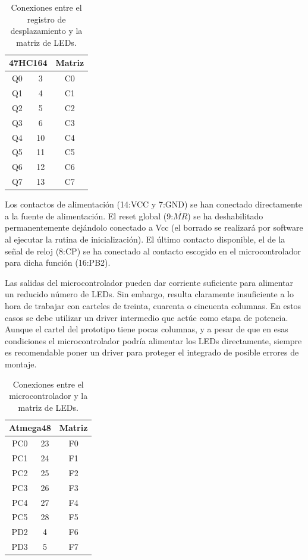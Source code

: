 \begin{table}[!htp]
\centering
\begin{tabular}[c]{|c|c|c|}
\hline
\multicolumn{2}{|c|}{\textbf{47HC164}} & \textbf{Matriz} \\
\hline
Q0 & 3 & C0 \\ \hline
Q1 & 4 & C1 \\ \hline
Q2 & 5 & C2 \\ \hline
Q3 & 6 & C3 \\ \hline
Q4 & 10 & C4 \\ \hline
Q5 & 11 & C5 \\ \hline
Q6 & 12 & C6 \\ \hline
Q7 & 13 & C7 \\
\hline
\end{tabular}
\caption{Conexiones entre el registro de desplazamiento y la matriz de LEDs.}
\label{tab:reg_col}
\end{table}

Los contactos de alimentación (14:VCC y 7:GND) se han conectado directamente a la fuente de alimentación. El reset global (9:$\overline{MR}$) se ha deshabilitado permanentemente dejándolo conectado a Vcc (el borrado se realizará por software al ejecutar la rutina de inicialización). El último contacto disponible, el de la señal de reloj (8:CP) se ha conectado al contacto escogido en el microcontrolador para dicha función (16:PB2).

Las salidas del microcontrolador pueden dar corriente suficiente para alimentar un reducido número de LEDs. Sin embargo, resulta claramente insuficiente a lo hora de trabajar con carteles de treinta, cuarenta o cincuenta columnas. En estos casos se debe utilizar un driver intermedio que actúe como etapa de potencia. Aunque el cartel del prototipo tiene pocas columnas, y a pesar de que en esas condiciones el microcontrolador podría alimentar los LEDs directamente, siempre es recomendable poner un driver para proteger el integrado de posible errores de montaje.

\begin{table}[!htp]
\centering
\begin{tabular}[c]{|c|c|c|}
\hline
\multicolumn{2}{|c|}{\textbf{Atmega48}} & \textbf{Matriz} \\
\hline
PC0 & 23 & F0 \\ \hline
PC1 & 24 & F1 \\ \hline
PC2 & 25 & F2 \\ \hline
PC3 & 26 & F3 \\ \hline
PC4 & 27 & F4 \\ \hline
PC5 & 28 & F5 \\ \hline
PD2 & 4  & F6 \\ \hline
PD3 & 5  & F7 \\
\hline
\end{tabular}
\caption{Conexiones entre el microcontrolador y la matriz de LEDs.}
\label{tab:filas}
\end{table}

